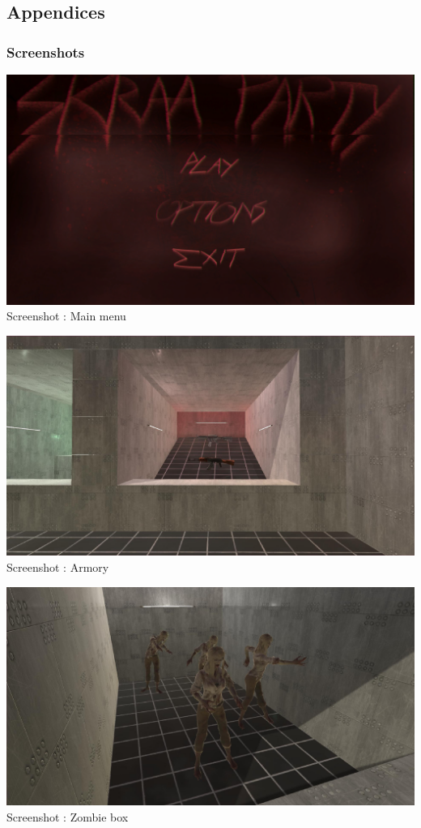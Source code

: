 \documentclass[12pt]{article}
\begin{document}
\subsection{Appendices}

    \subsubsection{Screenshots}
    
    \bigskip
\begin{center}	
	\includegraphics[scale = 0.40]{Main_menu.PNG}\\[1cm]
    Screenshot : Main menu
\end{center}
\newpage
\begin{center}	
	\includegraphics[scale = 0.60]{Screen_Armes-ConvertImage.jpg}\\[1cm]
    Screenshot : Armory
\end{center}
\newpage
\begin{center}	
	\includegraphics[scale = 0.60]{Screen_Zombies-ConvertImage.jpg}\\[1cm]
    Screenshot : Zombie box
\end{center}
\end{document}

